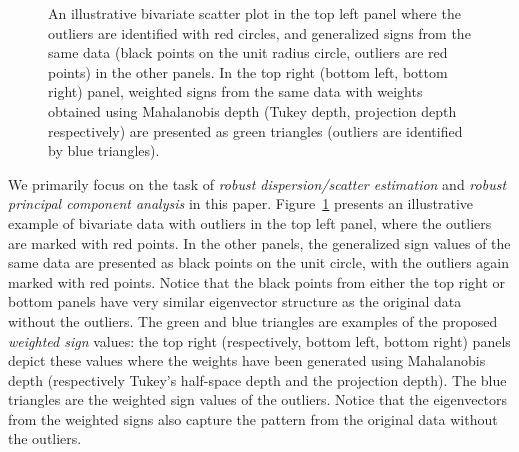 \begin{figure}[t!]
\begin{center}
\caption{
An illustrative bivariate scatter plot in the top left panel where the outliers are 
identified with red circles, 
and generalized signs from the same data (black points on the 
unit radius circle, outliers are red points) in the other panels. 
In the top right (bottom left, bottom right) 
panel, weighted signs from the same data with weights obtained using Mahalanobis depth 
(Tukey depth, projection depth respectively) are presented as green triangles 
(outliers are identified by blue triangles). 
}
\label{fig:Fig1}
\end{center}
\end{figure}

We primarily focus on the task of \textit{robust dispersion/scatter estimation} and 
\textit{robust principal component analysis} in this paper. Figure~\ref{fig:Fig1} presents an illustrative example of bivariate data with outliers in the top left panel, where the outliers are marked with red points. In the 
other panels, the generalized sign values of the same data are presented as black points 
on the unit circle, with the outliers again marked with red points. Notice that the 
black points from either the top right or bottom panels have very similar eigenvector 
structure as the original data without the outliers. The green and blue triangles 
are examples of 
the proposed \textit{weighted sign} values: the top right (respectively, bottom left, 
bottom right) panels depict these values where the weights have been generated using 
Mahalanobis depth (respectively Tukey's half-space depth and the projection depth). The 
blue triangles are the weighted sign values of the outliers. Notice that the eigenvectors 
from the weighted signs also capture the pattern from the original data without the 
outliers.


